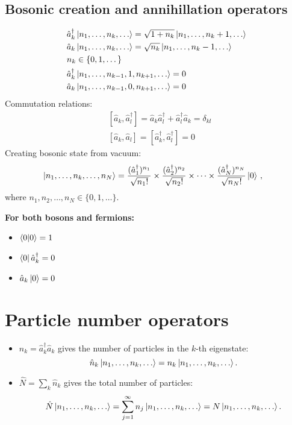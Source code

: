 \documentclass[11pt, a4paper]{article}
\begin{document}
\subsection{Bosonic creation and annihillation operators}
\begin{align*}
    &\hat a_k^{\dagger} \ket{n_1, \dots, n_k, \dots} = \sqrt{1+n_k}\ket{n_1, \dots, n_k + 1, \dots} \\
    &\hat a_k \ket{n_1, \dots, n_k, \dots} = \sqrt{n_k} \ket{n_1, \dots, n_k - 1, \dots} \\
    &n_k \in \{0,1,\dots\}\\
    &\hat a_k^{\dagger} \ket{n_1, \dots, n_{k-1}, 1, n_{k+1},\dots} = 0 \\
    &\hat a_k \ket{n_1, \dots, n_{k-1}, 0, n_{k+1},\dots} = 0\\
\end{align*}
Commutation relations:
\begin{align*}
    &[\hat a_k, \hat a_l^{\dagger}]  = \hat a_k\hat a_l^{\dagger}+\hat a_l^{\dagger}\hat a_k = \delta_{kl}\\
    &[\hat a_k, \hat a_l] = [ \hat a_k^{\dagger}, \hat a_l^{\dagger} ] = 0
\end{align*}
Creating bosonic state from vacuum:
\begin{align*}
    &\ket{n_1, \dots, n_k, \dots, n_N} = \frac{(\hat a_1^{\dagger})^{n_1}}{\sqrt{n_1!}} \times \frac{(\hat a_2^{\dagger})^{n_2}}{\sqrt{n_2!}}
    \times \dots \times \frac{(\hat a_N^{\dagger})^{n_N}}{\sqrt{n_N!}} \ket{0}\,,
\end{align*}
where $n_1, n_2, \dots ,n_N \in \{0,1,\dots\}$.
\par\textbf{For both bosons and fermions:}
\begin{itemize}
    \item $\braket{0|0} = 1$
    \item $\bra 0 \hat a_k^{\dagger} = 0$
    \item $\hat a_k \ket 0 = 0$
\end{itemize}
\section{Particle number operators}
\begin{itemize}
    \item $\hat n_k = \hat a_k^{\dagger}\hat a_k $ gives the number of particles in the $k$-th eigenstate:
    \begin{equation*}
        \hat n_k \ket{n_1, \dots, n_k, \dots} = n_k \ket{n_1, \dots, n_k, \dots}.
    \end{equation*}
    \item $\hat N = \sum\limits_k \hat n_k$ gives the total number of particles:
    \begin{equation*}
        \hat N \ket{n_1, \dots, n_k, \dots} = \sum\limits_{j=1}^{\infty}n_j \ket{n_1, \dots, n_k, \dots}
        = N \ket{n_1, \dots, n_k, \dots}.
    \end{equation*}
\end{itemize}
\end{document}
